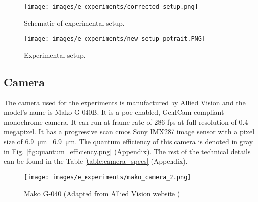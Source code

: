 

\begin{figure}[ht]
    \centering
    \texttt{[image: images/e\_experiments/corrected\_setup.png]}
    \caption{Schematic of experimental setup.}
    \label{fig:corrected_setup.png}
\end{figure}

\begin{figure}[ht]
    \centering
    \texttt{[image: images/e\_experiments/new\_setup\_potrait.PNG]}
    \caption{Experimental setup.}
    \label{fig:new_setup_potrait.PNG}
\end{figure}

\subsection{Camera}
    The camera used for the experiments is manufactured by Allied Vision and the model's name is Mako G-040B. It is a \gls{poe} enabled, GenICam\cite{genicam} compliant monochrome camera. It can run at frame rate of 286 \gls{fps} at full resolution of 0.4 megapixel. It has a progressive scan \gls{cmos} Sony IMX287 image sensor with a pixel size of \SI{6.9}{\micro\meter} \times \ \SI{6.9}{\micro\meter}. The quantum efficiency of this camera is denoted in gray in Fig. \ref{fig:quantum_efficiency.png} (Appendix). The rest of the technical details can be found in the Table \ref{table:camera_specs} (Appendix).

    \vspace{10mm}

    \begin{figure}[ht]
        \centering
        \texttt{[image: images/e\_experiments/mako\_camera\_2.png]}
        \caption{Mako G-040 (Adapted from Allied Vision website \cite{mako_camera})}
        \label{fig:mako_camera.png}
    \end{figure}

